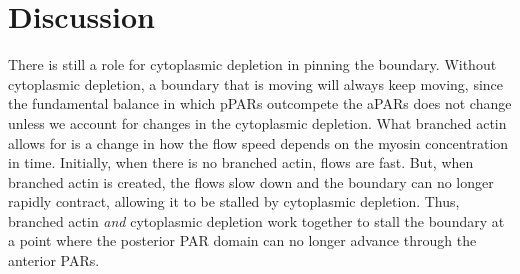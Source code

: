 \documentclass[11pt]{article}
\newcommand{\6}[1]{#1_{\text{6}}}
\newcommand{\3}[1]{#1_{\text{3}}}
\begin{document}
\section{Discussion}
There is still a role for cytoplasmic depletion in pinning the boundary. Without cytoplasmic depletion, a boundary that is moving will always keep moving, since the fundamental balance in which pPARs outcompete the aPARs does not change unless we account for changes in the cytoplasmic depletion. What branched actin allows for is a change in how the flow speed depends on the myosin concentration in time. Initially, when there is no branched actin, flows are fast. But, when branched actin is created, the flows slow down and the boundary can no longer rapidly contract, allowing it to be stalled by cytoplasmic depletion. Thus, branched actin \emph{and} cytoplasmic depletion work together to stall the boundary at a point where the posterior PAR domain can no longer advance through the anterior PARs.






\end{document}
